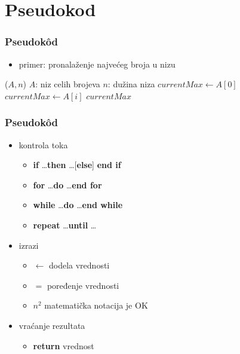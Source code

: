 \documentclass[compress,aspectratio=169]{beamer}
\begin{document}
\section[Pseudokôd]{Pseudokod}
\begin{frame}[fragile]
  \frametitle{Pseudokôd}
  \begin{itemize}
    \item primer: pronalaženje najvećeg broja u nizu
  \end{itemize}
\begin{algorithmic}
\STATE {}($A,n$)
\REQUIRE $A$: niz celih brojeva
\REQUIRE $n$: dužina niza
\STATE $currentMax \leftarrow A[0]$
    \STATE $currentMax \leftarrow A[i]$
  \ENDIF
\ENDFOR
\RETURN $currentMax$
\end{algorithmic}
\end{frame}
\begin{frame}[fragile]
  \frametitle{Pseudokôd}
  \begin{itemize}
    \item kontrola toka
    \begin{itemize}
      \item \textbf{if} \ldots \textbf{then} \ldots [\textbf{else}] \textbf{end
      if} 
      \item \textbf{for} \ldots \textbf{do} \ldots \textbf{end for} 
      \item \textbf{while} \ldots \textbf{do} \ldots \textbf{end while} 
      \item \textbf{repeat} \ldots \textbf{until} \ldots 
    \end{itemize}
    \item izrazi 
    \begin{itemize}
      \item $\leftarrow$ dodela vrednosti 
      \item $=$ poređenje vrednosti 
      \item $n^2$ matematička notacija je OK 
    \end{itemize}
    \item vraćanje rezultata
    \begin{itemize}
      \item \textbf{return} vrednost 
    \end{itemize}
  \end{itemize}
\end{frame}
\end{document}
